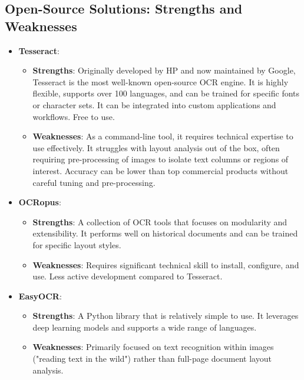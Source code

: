 \subsection{Open-Source Solutions: Strengths and Weaknesses}
\label{subsec:ocr-opensource-solutions}
\begin{itemize}
	\item \textbf{Tesseract}:
	      \begin{itemize}
		      \item \textbf{Strengths}: Originally developed by HP and now maintained by Google, Tesseract is the most well-known open-source OCR engine. It is highly flexible, supports over 100 languages, and can be trained for specific fonts or character sets. It can be integrated into custom applications and workflows. Free to use.
		      \item \textbf{Weaknesses}: As a command-line tool, it requires technical expertise to use effectively. It struggles with layout analysis out of the box, often requiring pre-processing of images to isolate text columns or regions of interest. Accuracy can be lower than top commercial products without careful tuning and pre-processing.
	      \end{itemize}
	\item \textbf{OCRopus}:
	      \begin{itemize}
		      \item \textbf{Strengths}: A collection of OCR tools that focuses on modularity and extensibility. It performs well on historical documents and can be trained for specific layout styles.
		      \item \textbf{Weaknesses}: Requires significant technical skill to install, configure, and use. Less active development compared to Tesseract.
	      \end{itemize}
	\item \textbf{EasyOCR}:
	      \begin{itemize}
		      \item \textbf{Strengths}: A Python library that is relatively simple to use. It leverages deep learning models and supports a wide range of languages.
		      \item \textbf{Weaknesses}: Primarily focused on text recognition within images ("reading text in the wild") rather than full-page document layout analysis.
	      \end{itemize}
\end{itemize}

